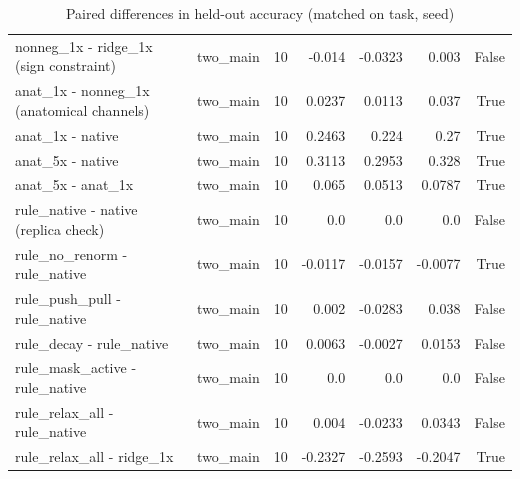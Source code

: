 \begin{table}[t]
\begin{tabular}{llrrrrr}
nonneg\_1x - ridge\_1x (sign constraint) & two\_main & 10 & -0.014 & -0.0323 & 0.003 & False \\
anat\_1x - nonneg\_1x (anatomical channels) & two\_main & 10 & 0.0237 & 0.0113 & 0.037 & True \\
anat\_1x - native & two\_main & 10 & 0.2463 & 0.224 & 0.27 & True \\
anat\_5x - native & two\_main & 10 & 0.3113 & 0.2953 & 0.328 & True \\
anat\_5x - anat\_1x & two\_main & 10 & 0.065 & 0.0513 & 0.0787 & True \\
rule\_native - native (replica check) & two\_main & 10 & 0.0 & 0.0 & 0.0 & False \\
rule\_no\_renorm - rule\_native & two\_main & 10 & -0.0117 & -0.0157 & -0.0077 & True \\
rule\_push\_pull - rule\_native & two\_main & 10 & 0.002 & -0.0283 & 0.038 & False \\
rule\_decay - rule\_native & two\_main & 10 & 0.0063 & -0.0027 & 0.0153 & False \\
rule\_mask\_active - rule\_native & two\_main & 10 & 0.0 & 0.0 & 0.0 & False \\
rule\_relax\_all - rule\_native & two\_main & 10 & 0.004 & -0.0233 & 0.0343 & False \\
rule\_relax\_all - ridge\_1x & two\_main & 10 & -0.2327 & -0.2593 & -0.2047 & True \\
\bottomrule
\end{tabular}
\caption{Paired differences in held-out accuracy (matched on task, seed)}
\label{tab:constrained_paired}
\end{table}